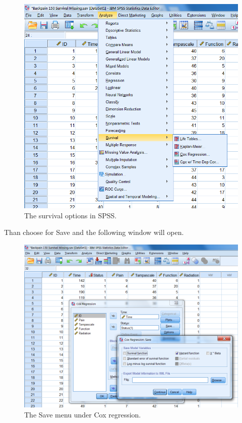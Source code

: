 \documentclass[
]{book}
\begin{document}
\begin{figure}

{\centering \includegraphics[width=0.9\linewidth]{images/fig5.5} 

}

\caption{The survival options in SPSS.}\label{fig:fig5-5}
\end{figure}

Than choose for Save and the following window will open.

\begin{figure}

{\centering \includegraphics[width=0.9\linewidth]{images/fig5.6} 

}

\caption{The Save menu under Cox regression.}\label{fig:fig5-6}
\end{figure}
\end{document}

